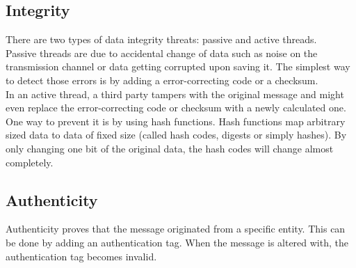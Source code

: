 \subsection*{Integrity}
There are two types of data integrity threats: passive and active threads.\\
Passive threads are due to accidental change of data such as noise on the transmission channel or data getting corrupted upon saving it. The simplest way to detect those errors is by adding a error-correcting code or a checksum.\\
In an active thread, a third party tampers with the original message and might even replace the error-correcting code or checksum with a newly calculated one. One way to prevent it is by using hash functions. Hash functions map arbitrary sized data to data of fixed size (called hash codes, digests or simply hashes). By only changing one bit of the original data, the hash codes will change almost completely.\\

\subsection*{Authenticity}
Authenticity proves that the message originated from a specific entity. This can be done by adding an authentication tag. When the message is altered with, the authentication tag becomes invalid.\\